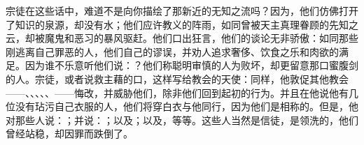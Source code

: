 宗徒在这些话中，难道不是向你描绘了那新近的无知之流吗？因为，他们仿佛打开了知识的泉源，却没有水；他们应许教义的阵雨，如同曾被天主真理眷顾的先知之云，却被魔鬼和恶习的暴风驱赶。他们口出狂言，他们的谈论无非骄傲：如同那些刚逃离自己罪恶的人，他们自己的谬误，并劝人追求奢侈、饮食之乐和肉欲的满足。因为谁不乐意听他们说：？他们称聪明审慎的人为败坏，却更留意那口蜜腹剑的人。宗徒，或者说救主藉的口，这样写给教会的天使：同样，他敦促其他教会——、、、、、——悔改，并威胁他们，除非他们回到起初的行为。并且在他说他有几位没有玷污自己衣服的人，他们将穿白衣与他同行，因为他们是相称的。但是，他对那些人说：；并说：；以及；以及，等等。这些人当然是信徒，是领洗的，他们曾经站稳，却因罪而跌倒了。\par

